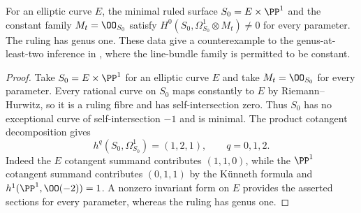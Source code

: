 \begin{proposition}\hypertarget{tag-01AR}{}\label{cdp:st:A.4.2}

For an elliptic curve $E$, the minimal ruled surface $S_0=E\times\PP^1$ and the constant family $M_t=\OO_{S_0}$ satisfy $H^0(S_0,\Omega^1_{S_0}\otimes M_t)\ne0$ for every parameter. The ruling has genus one. These data give a counterexample to the genus-at-least-two inference in \cite[Proposition~7.3 and Step~1, p.~693]{CDP20}, where the line-bundle family is permitted to be constant.
\end{proposition}


\begin{proof}
Take $S_0=E\times\PP^1$ for an elliptic curve $E$ and take $M_t=\OO_{S_0}$ for every parameter. Every rational curve on $S_0$ maps constantly to $E$ by Riemann--Hurwitz, so it is a ruling fibre and has self-intersection zero. Thus $S_0$ has no exceptional curve of self-intersection $-1$ and is minimal. The product cotangent decomposition gives
\[
 h^q(S_0,\Omega^1_{S_0})=(1,2,1),\qquad q=0,1,2.
\]
Indeed the $E$ cotangent summand contributes $(1,1,0)$, while the $\PP^1$ cotangent summand contributes $(0,1,1)$ by the K\"unneth formula and $h^1(\PP^1,\OO(-2))=1$. A nonzero invariant form on $E$ provides the asserted sections for every parameter, whereas the ruling has genus one.

\end{proof}